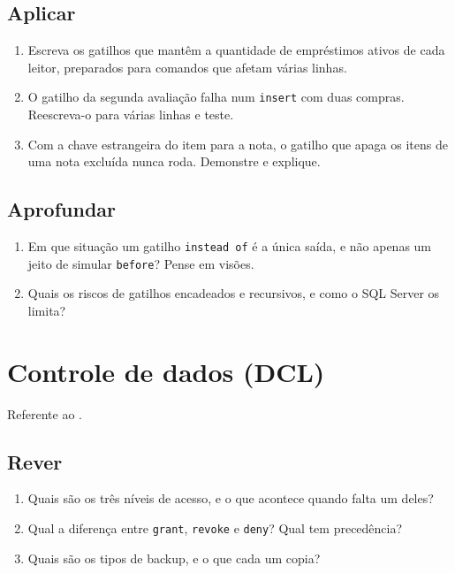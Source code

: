 \subsection*{Aplicar}
\begin{enumerate}
	\item Escreva os gatilhos que mantêm a quantidade de empréstimos
	ativos de cada leitor, preparados para comandos que afetam várias
	linhas.
	\item O gatilho da segunda avaliação falha num \texttt{insert} com duas
	compras. Reescreva-o para várias linhas e teste.
	\item Com a chave estrangeira do item para a nota, o gatilho que apaga
	os itens de uma nota excluída nunca roda. Demonstre e explique.
\end{enumerate}

\subsection*{Aprofundar}
\begin{enumerate}
	\item Em que situação um gatilho \texttt{instead of} é a única saída,
	e não apenas um jeito de simular \texttt{before}? Pense em visões.
	\item Quais os riscos de gatilhos encadeados e recursivos, e como o
	SQL Server os limita?
\end{enumerate}

\section{Controle de dados (DCL)}

Referente ao .

\subsection*{Rever}
\begin{enumerate}
	\item Quais são os três níveis de acesso, e o que acontece quando
	falta um deles?
	\item Qual a diferença entre \texttt{grant}, \texttt{revoke} e
	\texttt{deny}? Qual tem precedência?
	\item Quais são os tipos de backup, e o que cada um copia?
\end{enumerate}

